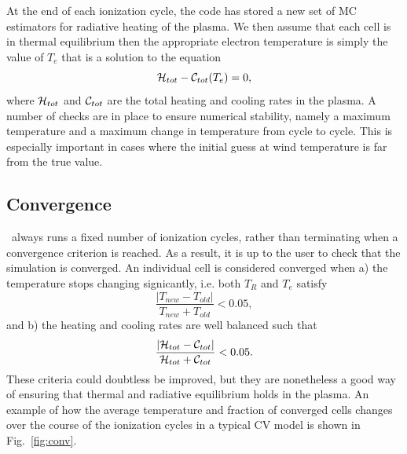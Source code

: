 At the end of each ionization cycle, the code has stored a new set
of MC estimators for radiative heating of the plasma. We then
assume that each cell is in thermal equilibrium then the appropriate
electron temperature is simply the value of $T_e$ that is a solution
to the equation
\begin{equation}
{\cal H}_{tot} - {\cal C}_{tot} ( T_e) = 0,
\end{equation}
where ${\cal H}_{tot}$ and ${\cal C}_{tot}$ are the total heating and cooling rates in 
the plasma. A number of checks are in place to ensure numerical stability,
namely a maximum temperature and a maximum change in temperature from cycle
to cycle. This is especially important in cases where the initial
guess at wind temperature is far from the true value.

\subsection{Convergence}

\py\ always runs a fixed number of ionization cycles, rather than terminating
when a convergence criterion is reached. As a result, it is up to the user
to check that the simulation is converged. An individual cell is considered
converged when a) the temperature stops changing signicantly, i.e. both
$T_R$ and $T_e$ satisfy
\begin{equation}
\frac{|T_{new} - T_{old}|}{T_{new} + T_{old}} < 0.05,
\end{equation}
and b) the heating and cooling rates are well balanced such that
\begin{equation}
\frac{|{\cal H}_{tot} - {\cal C}_{tot}|}{{\cal H}_{tot} + {\cal C}_{tot}} < 0.05.
\end{equation}
These criteria could doubtless be improved, but they are nonetheless
a good way of ensuring that thermal and radiative equilibrium holds in the 
plasma. An example of how the average temperature and fraction
of converged cells changes over the course of the ionization cycles in
a typical CV model is shown in Fig.~\ref{fig:conv}.


